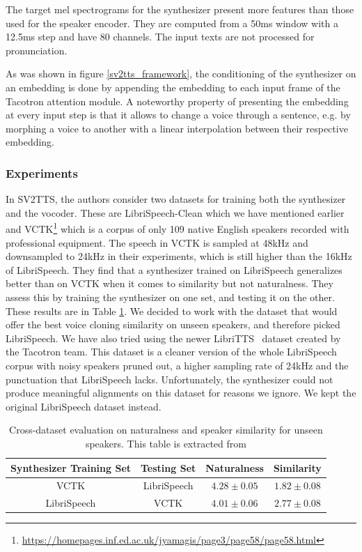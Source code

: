 \documentclass[a4paper, oneside, 12pt, english]{article}
\begin{document}
The target mel spectrograms for the synthesizer present more features than those used for the speaker encoder. They are computed from a 50ms window with a 12.5ms step and have 80 channels. The input texts are not processed for pronunciation.

As was shown in figure \ref{sv2tts_framework}, the conditioning of the synthesizer on an embedding is done by appending the embedding to each input frame of the Tacotron attention module. A noteworthy property of presenting the embedding at every input step is that it allows to change a voice through a sentence, e.g. by morphing a voice to another with a linear interpolation between their respective embedding.

\subsubsection{Experiments}
In SV2TTS, the authors consider two datasets for training both the synthesizer and the vocoder. These are LibriSpeech-Clean which we have mentioned earlier and VCTK\footnote{\url{https://homepages.inf.ed.ac.uk/jyamagis/page3/page58/page58.html}} which is a corpus of only 109 native English speakers recorded with professional equipment. The speech in VCTK is sampled at 48kHz and downsampled to 24kHz in their experiments, which is still higher than the 16kHz of LibriSpeech. They find that a synthesizer trained on LibriSpeech generalizes better than on VCTK when it comes to similarity but not naturalness. They assess this by training the synthesizer on one set, and testing it on the other. These results are in Table \ref{libri_vctk_cross}. We decided to work with the dataset that would offer the best voice cloning similarity on unseen speakers, and therefore picked LibriSpeech. We have also tried using the newer LibriTTS~\citep{LibriTTS} dataset created by the Tacotron team. This dataset is a cleaner version of the whole LibriSpeech corpus with noisy speakers pruned out, a higher sampling rate of 24kHz and the punctuation that LibriSpeech lacks. Unfortunately, the synthesizer could not produce meaningful alignments on this dataset for reasons we ignore. We kept the original LibriSpeech dataset instead.

\begin{table}[h]
	\begin{center}
		\begin{small}
			\begin{tabular}{cccc}
				\toprule
				Synthesizer Training Set & Testing Set & Naturalness & Similarity \\
				\midrule
				VCTK & LibriSpeech & $4.28 \pm 0.05$ & $1.82 \pm 0.08$ \\
				LibriSpeech & VCTK & $4.01 \pm 0.06$ & $2.77 \pm 0.08$ \\
				\bottomrule
			\end{tabular}
		\end{small}
	\end{center}
	\caption{Cross-dataset evaluation on naturalness and speaker similarity for unseen speakers. This table is extracted from \citep{SV2TTS}}
	\label{libri_vctk_cross}
\end{table}
\end{document}

